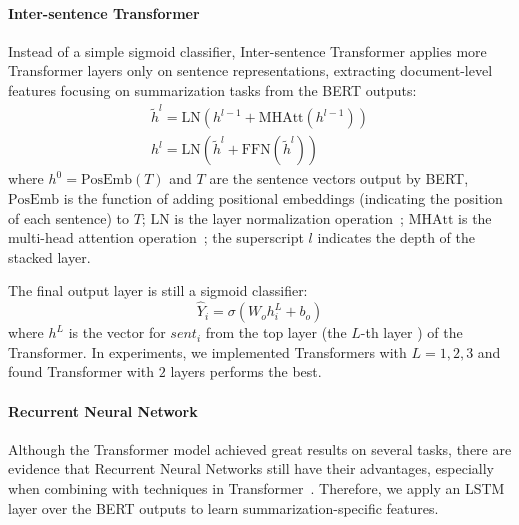     
    
    \paragraph{Inter-sentence Transformer}
    Instead of a simple sigmoid classifier, Inter-sentence Transformer applies more Transformer layers only on sentence representations, extracting document-level features focusing on  summarization tasks from the BERT outputs:
    \begin{gather}
    \tilde{h}^l=\mathrm{LN}(h^{l-1}+\mathrm{MHAtt}(h^{l-1}))\\
    h^l=\mathrm{LN}(\tilde{h}^l+\mathrm{FFN}(\tilde{h}^l))
    \end{gather}
    where $h^0=\mathrm{PosEmb}(T)$ and $T$ are the sentence vectors output by BERT, $\mathrm{PosEmb}$ is the function of adding positional embeddings (indicating the position of each sentence) to $T$;
    $\mathrm{LN}$ is the layer normalization operation~\cite{ba2016layer}; $\mathrm{MHAtt}$ is the multi-head attention operation~\cite{vaswani2017attention};
    the superscript $l$ indicates the depth of the stacked layer.
    
    The final output layer is still a sigmoid classifier:
    \begin{equation}
    \hat{Y}_i = \sigma(W_oh_i^L+b_o)
    \end{equation}
    where $h^L$ is the vector for $sent_i$ from the top layer (the $L$-th layer ) of the Transformer. In experiments, we implemented Transformers with $L=1, 2, 3$  and found Transformer with $2$ layers performs the best.
    
    \paragraph{Recurrent Neural Network}
    Although the Transformer model achieved great results on several tasks, there are evidence that Recurrent Neural Networks  still have their advantages, especially when combining with techniques in Transformer~\cite{chen2018best}. Therefore, we apply an LSTM layer over the BERT outputs to learn summarization-specific features. 
    

